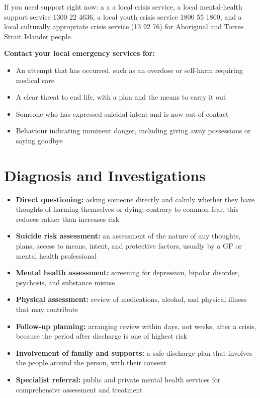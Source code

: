 If you need support right now: a a a local crisis service, a local mental-health support service 1300 22 4636, a local youth crisis service 1800 55 1800, and a local culturally appropriate crisis service (13 92 76) for Aboriginal and Torres Strait Islander people.

\textbf{Contact your local emergency services for:}
\begin{itemize}
    \item An attempt that has occurred, such as an overdose or self-harm requiring medical care
    \item A clear threat to end life, with a plan and the means to carry it out
    \item Someone who has expressed suicidal intent and is now out of contact
    \item Behaviour indicating imminent danger, including giving away possessions or saying goodbye
\end{itemize}

\section*{Diagnosis and Investigations}
\begin{itemize}
    \item \textbf{Direct questioning:} asking someone directly and calmly whether they have thoughts of harming themselves or dying; contrary to common fear, this reduces rather than increases risk
    \item \textbf{Suicide risk assessment:} an assessment of the nature of any thoughts, plans, access to means, intent, and protective factors, usually by a GP or mental health professional
    \item \textbf{Mental health assessment:} screening for depression, bipolar disorder, psychosis, and substance misuse
    \item \textbf{Physical assessment:} review of medications, alcohol, and physical illness that may contribute
    \item \textbf{Follow-up planning:} arranging review within days, not weeks, after a crisis, because the period after discharge is one of highest risk
    \item \textbf{Involvement of family and supports:} a safe discharge plan that involves the people around the person, with their consent
    \item \textbf{Specialist referral:} public and private mental health services for comprehensive assessment and treatment
\end{itemize}

